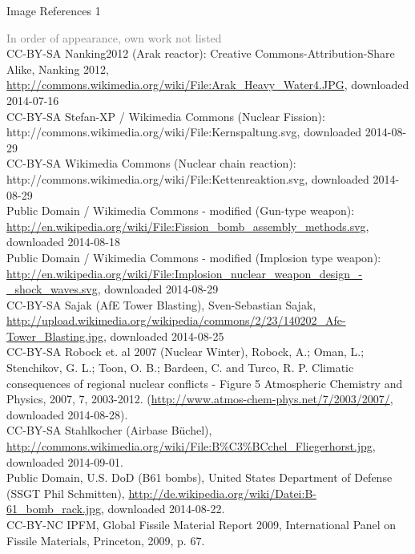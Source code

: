 \documentclass[presentation]{beamer}
\begin{document}
\begin{frame}[label=sec-7-1]{Image References 1}
\fontsize{3pt}{3.6}\selectfont

\textcolor{gray}{In order of appearance, own work not listed}\\[0.5em]

CC-BY-SA Nanking2012 (Arak reactor): Creative Commons-Attribution-Share Alike, Nanking 2012, \url{http://commons.wikimedia.org/wiki/File:Arak_Heavy_Water4.JPG}, downloaded 2014-07-16 \\[0.3em]

CC-BY-SA Stefan-XP / Wikimedia Commons (Nuclear Fission): http://commons.wikimedia.org/wiki/File:Kernspaltung.svg, downloaded 2014-08-29 \\[0.3em]

CC-BY-SA Wikimedia Commons (Nuclear chain reaction): http://commons.wikimedia.org/wiki/File:Kettenreaktion.svg, downloaded 2014-08-29\\[0.3em]

Public Domain / Wikimedia Commons - modified (Gun-type weapon): \url{http://en.wikipedia.org/wiki/File:Fission_bomb_assembly_methods.svg}, downloaded 2014-08-18\\[0.3em]

Public Domain / Wikimedia Commons - modified (Implosion type weapon): \url{http://en.wikipedia.org/wiki/File:Implosion_nuclear_weapon_design_-_shock_waves.svg}, downloaded 2014-08-29\\[0.3em]

CC-BY-SA Sajak (AfE Tower Blasting), Sven-Sebastian Sajak, \url{http://upload.wikimedia.org/wikipedia/commons/2/23/140202_Afe-Tower_Blasting.jpg}, downloaded 2014-08-25\\[0.3em]

CC-BY-SA Robock et. al 2007 (Nuclear Winter), Robock, A.; Oman, L.; Stenchikov, G. L.; Toon, O. B.; Bardeen, C. and Turco, R. P. Climatic consequences of regional nuclear conflicts - Figure 5 Atmospheric Chemistry and Physics, 2007, 7, 2003-2012. (\url{http://www.atmos-chem-phys.net/7/2003/2007/}, downloaded 2014-08-28).\\[0.3em]

CC-BY-SA Stahlkocher (Airbase Büchel), \url{http://commons.wikimedia.org/wiki/File:B\%C3\%BCchel_Fliegerhorst.jpg}, downloaded 2014-09-01.\\[0.3em]

Public Domain, U.S. DoD (B61 bombs), United States Department of Defense (SSGT Phil Schmitten), \url{http://de.wikipedia.org/wiki/Datei:B-61_bomb_rack.jpg}, downloaded 2014-08-22.\\[0.3em]

CC-BY-NC IPFM, Global Fissile Material Report 2009, International Panel on Fissile Materials, Princeton, 2009, p. 67.\\[0.3em]
\end{frame}
\end{document}
